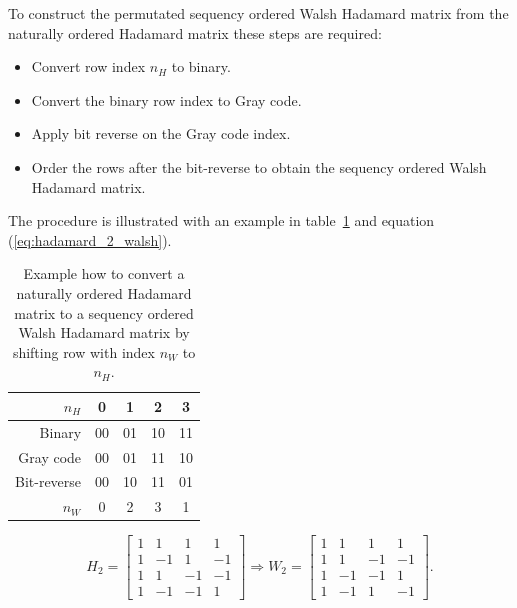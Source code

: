 To construct the permutated sequency ordered Walsh Hadamard matrix from the naturally ordered Hadamard matrix these steps are required:

\begin{itemize}
    \item Convert row index $n_H$ to binary.
    \item Convert the binary row index to Gray code.
    \item Apply bit reverse on the Gray code index.
\item Order the rows after the bit-reverse to obtain the sequency ordered Walsh Hadamard matrix.
\end{itemize}

The procedure is illustrated with an example in table~\ref{tab:Hadamard_2_Walsh} and equation (\ref{eq:hadamard_2_walsh}).  

\begin{table}[H]
\centering
\begin{tabular}{|r|c|c|c|c|}
\hline
    $n_H$        & 0    & 1     & 2     & 3     \\ \hline
    Binary       & 00   & 01    & 10    & 11    \\ \hline
    Gray code    & 00   & 01    & 11    & 10    \\ \hline
    Bit-reverse  & 00   & 10    & 11    & 01    \\ \hline
    $n_W$        & 0    & 2     & 3     & 1     \\ \hline
    
\end{tabular}
	\caption{Example how to convert a naturally ordered Hadamard matrix to a sequency ordered Walsh Hadamard matrix by shifting row with index $n_W$ to $n_H$.}
	\label{tab:Hadamard_2_Walsh}
\end{table}


\begin{equation}
\label{eq:hadamard_2_walsh}
    H_2 =  \begin{bmatrix}
       1 & 1 & 1 & 1 \\
       1 & -1 & 1 & -1 \\
       1 & 1 & -1 & -1 \\
       1 & -1 & -1 & 1 
       \end{bmatrix} \Rightarrow W_2 = \begin{bmatrix}
       1 & 1 & 1 & 1 \\
       1 & 1 & -1 & -1  \\
       1 & -1 & -1 & 1  \\
       1 & -1 & 1 & -1 
       \end{bmatrix}.
\end{equation}

